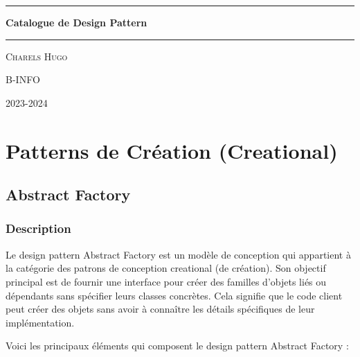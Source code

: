 \documentclass[french]{article}
\begin{document}
\begin{titlepage}
	\centering
    \vspace{2.5cm} 
    
    \noindent\rule{15cm}{0.4pt}
    \vspace{0.25cm} 
    {\huge\bfseries Catalogue de Design Pattern \par}
    \vspace{0.5cm}
    {\scshape\Large  \par}
    \vspace{0.5cm}
    \noindent\rule{15cm}{0.4pt}
    \vfill


	{\Large\scshape Charels Hugo \par}
	\vspace{0.5cm}
	{\Large\scshape B-INFO\par}
	\vspace{1cm}
	{\large 2023-2024 \par}
\end{titlepage}


\tableofcontents
\clearpage


\section{Patterns de Création (Creational)}


\subsection{Abstract Factory}

\subsubsection{Description}

Le design pattern Abstract Factory est un modèle de conception qui appartient à la catégorie des patrons de conception creational (de création). Son objectif principal est de fournir une interface pour créer des familles d'objets liés ou dépendants sans spécifier leurs classes concrètes. Cela signifie que le code client peut créer des objets sans avoir à connaître les détails spécifiques de leur implémentation.

Voici les principaux éléments qui composent le design pattern Abstract Factory :
\end{document}
